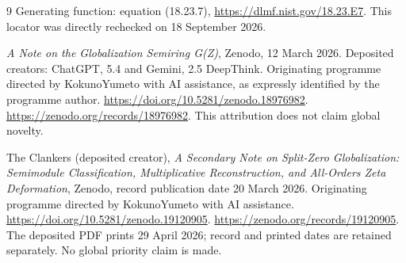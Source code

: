 \documentclass[11pt,a4paper]{article}
\begin{document}
\begin{thebibliography}{9}
Generating function: equation (18.23.7),
\url{https://dlmf.nist.gov/18.23.E7}.
This locator was directly rechecked on 18 September 2026.

\emph{A Note on the Globalization Semiring G(Z)}, Zenodo,
12 March 2026. Deposited creators: ChatGPT, 5.4 and Gemini, 2.5 DeepThink.
Originating programme directed by KokunoYumeto with AI assistance,
as expressly identified by the programme author.
\url{https://doi.org/10.5281/zenodo.18976982}.
\url{https://zenodo.org/records/18976982}.
This attribution does not claim global novelty.

The Clankers (deposited creator), \emph{A Secondary Note on Split-Zero
Globalization: Semimodule Classification, Multiplicative Reconstruction,
and All-Orders Zeta Deformation}, Zenodo, record publication date
20 March 2026. Originating programme directed by KokunoYumeto
with AI assistance. \url{https://doi.org/10.5281/zenodo.19120905}.
\url{https://zenodo.org/records/19120905}.
The deposited PDF prints 29 April 2026; record and printed dates
are retained separately. No global priority claim is made.
\end{thebibliography}
\end{document}

